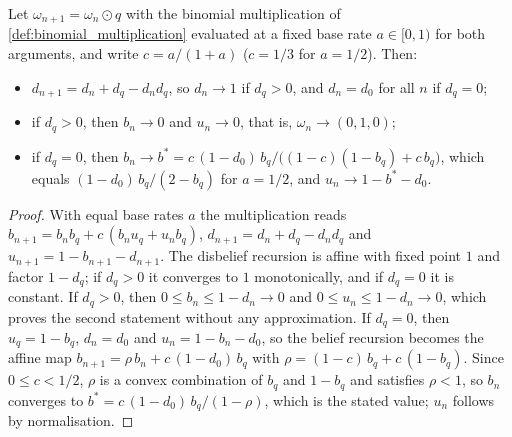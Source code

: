 \begin{theorem}\label{thm:geo}
Let $\omega_{n+1} = \omega_n \odot q$ with the binomial multiplication of \cref{def:binomial_multiplication} evaluated at a fixed base rate $a \in [0,1)$ for both arguments, and write $c = a/(1+a)$ ($c = 1/3$ for $a = 1/2$). Then:
\begin{itemize}
    \item $d_{n+1} = d_n + d_q - d_n d_q$, so $d_n \to 1$ if $d_q > 0$, and $d_n = d_0$ for all $n$ if $d_q = 0$;
    \item if $d_q > 0$, then $b_n \to 0$ and $u_n \to 0$, that is, $\omega_n \to (0, 1, 0)$;
    \item if $d_q = 0$, then $b_n \to b^* = c\,(1 - d_0)\, b_q \big/ \big((1 - c)(1 - b_q) + c\, b_q\big)$, which equals $(1 - d_0)\, b_q/(2 - b_q)$ for $a = 1/2$, and $u_n \to 1 - b^* - d_0$.
\end{itemize}
\end{theorem}
\begin{proof}
With equal base rates $a$ the multiplication reads $b_{n+1} = b_n b_q + c\,(b_n u_q + u_n b_q)$, $d_{n+1} = d_n + d_q - d_n d_q$ and $u_{n+1} = 1 - b_{n+1} - d_{n+1}$. The disbelief recursion is affine with fixed point $1$ and factor $1 - d_q$; if $d_q > 0$ it converges to $1$ monotonically, and if $d_q = 0$ it is constant. If $d_q > 0$, then $0 \le b_n \le 1 - d_n \to 0$ and $0 \le u_n \le 1 - d_n \to 0$, which proves the second statement without any approximation. If $d_q = 0$, then $u_q = 1 - b_q$, $d_n = d_0$ and $u_n = 1 - b_n - d_0$, so the belief recursion becomes the affine map $b_{n+1} = \rho\, b_n + c\,(1 - d_0)\, b_q$ with $\rho = (1 - c)\, b_q + c\,(1 - b_q)$. Since $0 \le c < 1/2$, $\rho$ is a convex combination of $b_q$ and $1 - b_q$ and satisfies $\rho < 1$, so $b_n$ converges to $b^* = c\,(1 - d_0)\, b_q / (1 - \rho)$, which is the stated value; $u_n$ follows by normalisation.
\end{proof}

